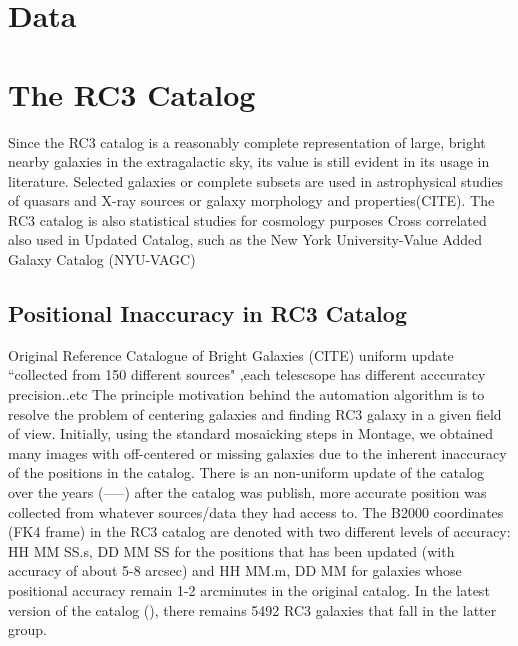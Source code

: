\documentclass[5p]{elsarticle}
\begin{document}
\section{Data}
	\section{The RC3 Catalog}

	Since the RC3 catalog is a reasonably complete representation of large, bright nearby galaxies in the extragalactic sky, its 
value is still evident in its usage in literature. Selected galaxies or complete subsets are used in astrophysical studies of  quasars and X-ray sources%
 or  galaxy morphology and properties(CITE).  The RC3 catalog is also statistical studies  for cosmology purposes Cross correlated also used in  Updated Catalog, such as the New York University-Value Added Galaxy Catalog (NYU-VAGC)

	\subsection{Positional Inaccuracy in RC3 Catalog}
Original Reference Catalogue of Bright Galaxies (CITE)
	uniform update ``collected from 150 different sources" ,each telescsope has different acccuratcy precision..etc
	The principle motivation behind the automation algorithm is to resolve the problem of centering galaxies and finding RC3 galaxy in a given field of view. Initially, using the standard mosaicking steps in Montage, we obtained many images with  off-centered or missing galaxies due to the inherent inaccuracy of the positions in the catalog. 
There is an non-uniform update of the catalog over the years (-----) after the catalog was publish, more accurate position was collected from whatever sources/data they had access to.
The B2000 coordinates (FK4 frame) in the RC3 catalog are denoted with two different levels of accuracy: HH MM SS.s, DD MM SS for the positions that has been updated  (with accuracy of about 5-8 arcsec) and  HH MM.m, DD MM for galaxies whose positional accuracy remain  1-2 arcminutes in the original catalog.  In the latest version of the catalog (\citet{rc31991}), there remains 5492 RC3 galaxies that fall in the latter group.
\end{document}
